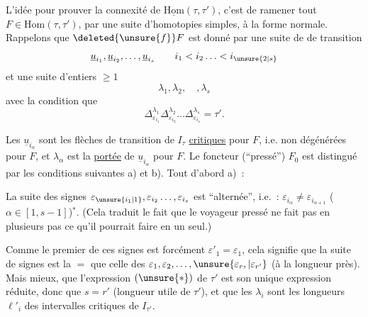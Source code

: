 L'idée pour prouver la connexité de $\underline{\mathrm{Hom}}(\tau,\tau')$, c'est de ramener tout $F\in\mathrm{Hom}(\tau,\tau')$, par une suite d'homotopies simples, à la forme normale. Rappelons que $\deleted{\unsure{f}}F$ est donné par une suite  de   de transition
\[
\underline{u}_{i_1},\underline{u}_{i_2},\ldots,\underline{u}_{i_s}\qquad i_1<i_2\ldots<i_{\unsure{2|s}}
\]
et une suite d'entiers $\geq1$
\[
\lambda_1,\lambda_2,\quad,\lambda_s
\]
avec la condition que
\[
\Delta_{\varepsilon_{i_1}}^{\lambda_1}\Delta_{\varepsilon_{i_2}}^{\lambda_2}\ldots
\Delta_{\varepsilon_{i_s}}^{\lambda_s}=\tau'.\tag*{$(*)$}
\]

Les $\underline{u}_{i_\alpha}$ sont les flèches de transition de $I_\tau$ \uline{critiques} pour $F$, i.e. non dégénérées pour $F$,  et $\lambda_\alpha$ est la \uline{portée} de $\underline{u}_{i_\alpha}$ pour $F$. Le  foncteur  (``pressé'') $F_0$ est distingué par les conditions suivantes a) et b). Tout d'abord a)~:

 La suite des signes $\varepsilon_{\unsure{i_1|1}},\varepsilon_{i_2}\ldots,\varepsilon_{i_s}$ est ``alternée'', \unsure{(}i.e.~: $\varepsilon_{i_\alpha}\ne\varepsilon_{i_{\alpha+1}}$ ($\alpha\in[1,s-1]$)$^*$. (Cela traduit le fait que le voyageur pressé ne fait pas en plusieurs pas ce qu'il pourrait faire en un seul.)

Comme le  premier de ces signes est forcément $\varepsilon'_1=\varepsilon_1$, cela signifie que  la suite de signes est la $=$ que celle des $\varepsilon_1,\varepsilon_2,\ldots,\unsure{\varepsilon_r,|\varepsilon_{r'}}$ (à la longueur près). Mais mieux, que l'expression $(\unsure{*})$ de $\tau'$ est son unique expression réduite, donc que $s=r'$ (longueur utile de $\tau'$), et que les $\lambda_i$ sont les longueurs $\ell'_i$ des intervalles critiques de $I_{\tau'}$.

